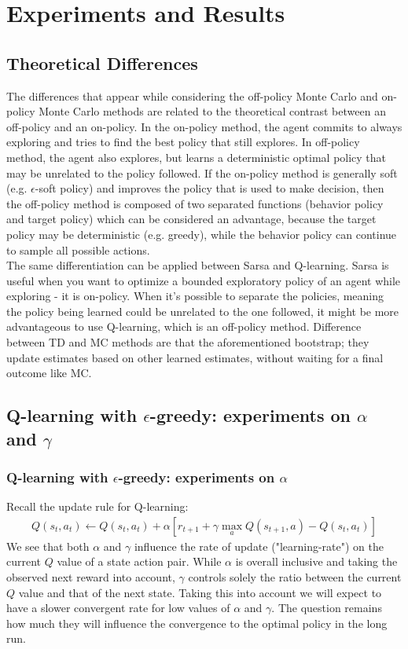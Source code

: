 \documentclass[paper=a4, fontsize=11pt]{scrartcl}
\numberwithin{equation}{section}		%
\numberwithin{figure}{section}			%
\numberwithin{table}{section}				%
\begin{document}
\section{Experiments and Results}
\label{results}

\subsection{Theoretical Differences}
The differences that appear while considering the off-policy Monte Carlo and on-policy Monte Carlo methods are related to the theoretical contrast between an off-policy and an on-policy. In the on-policy method, the agent commits to always exploring and tries to find the best policy that still explores. In off-policy method, the agent also explores, but learns a deterministic optimal policy that may be unrelated to the policy followed. If the on-policy  method is generally soft (e.g. $\epsilon$-soft policy) and improves the policy that is used to make decision, then the off-policy method is composed of two separated functions (behavior policy and target policy) which can be considered an advantage, because the target policy may be deterministic (e.g. greedy), while the behavior policy can continue to sample all possible actions. \\
The same differentiation can be applied between Sarsa and Q-learning. Sarsa is useful when you want to optimize a bounded exploratory policy of an agent while exploring - it is on-policy. When it's possible to separate the policies, meaning the policy being learned could be unrelated to the one followed, it might be more advantageous to use Q-learning, which is an off-policy method. Difference between TD and MC methods are that the aforementioned bootstrap; they update estimates based on other learned estimates, without waiting for a final outcome like MC.

\subsection{Q-learning with $\epsilon$-greedy: experiments on $\alpha$ and $\gamma$}
\subsubsection*{Q-learning with $\epsilon$-greedy: experiments on $\alpha$}
Recall the update rule for Q-learning:
\begin{align}
Q(s_t,a_t) \leftarrow Q(s_t,a_t)+\alpha[r_{t+1}+\gamma \max_a Q(s_{t+1},a)-Q(s_t,a_t)]
\end{align}
We see that both $\alpha$ and $\gamma$ influence the rate of update ("learning-rate") on the current $Q$ value of a state action pair. While $\alpha$ is overall inclusive and taking the observed next reward into account, $\gamma$ controls solely the ratio between the current $Q$ value and that of the next state. Taking this into account we will expect to have a slower convergent rate for low values of $\alpha$ and $\gamma$. The question remains how much they will influence the convergence to the optimal policy in the long run.
\end{document}
